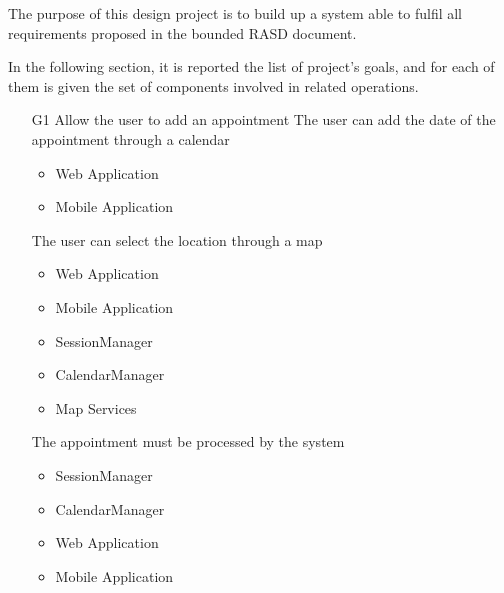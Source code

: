  
 The purpose of this design project is to build up a system able to fulfil all requirements proposed in the bounded RASD document. 
 
 In the following section, it is reported the list of project's goals, and for each of them is given the set of components involved in related operations.
 
 \vspace{1cm}
 
 \begin{itemize}
 	\item[G1] Allow the user to add an appointment
 	\subitem[G1.1] The user can add the date of the appointment through a calendar
 	\begin{itemize}[leftmargin=1in]
 		\item Web Application
 		\item Mobile Application
 	\end{itemize}
 	\subitem[G1.2] The user can select the location through a map
 	\begin{itemize}[leftmargin=1in]
 		\item Web Application
 		\item Mobile Application
 		\item SessionManager
 		\item CalendarManager
 		\item Map Services
 	\end{itemize}
 	\subitem[G1.3] The appointment must be processed by the system
 	\begin{itemize}[leftmargin=1in]
 		\item SessionManager
 		\item CalendarManager
 		\item Web Application
 		\item Mobile Application
 	\end{itemize}
 \vspace{0.5cm}
 

\end{itemize}
